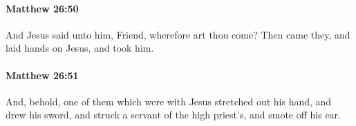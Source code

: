 		\paragraph{Matthew 26:50} %
			\label{MATTHEW-26-50}

			And Jesus said unto him, Friend, wherefore art thou come? Then came they, and laid hands on Jesus, and took him.

			\begin{framed}
			\scriptsize
				\begin{compactdesc}
					\item[SBLG] 
				\end{compactdesc}
			\end{framed}

		\paragraph{Matthew 26:51} %
			\label{MATTHEW-26-51}

			And, behold, one of them which were with Jesus stretched out his hand, and drew his sword, and struck a servant of the high priest's, and smote off his ear.

